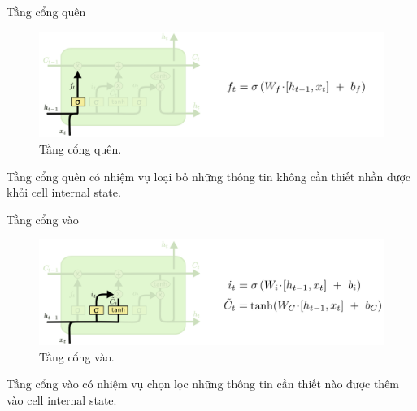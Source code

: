 \documentclass[notheorems,hyperref={bookmarks=true}]{beamer}
\theoremstyle{plain}
\numberwithin{equation}{section}
\begin{document}
\begin{footnotesize}
\begin{frame}{Tầng cổng quên}
\begin{figure}[H]
\centering
	\includegraphics[width=\linewidth]{figures/LSTM3-focus-f.png}
	\caption{Tầng cổng quên.}
\end{figure}
\par Tầng cổng quên có nhiệm vụ loại bỏ những thông tin không cần thiết nhần được khỏi cell internal state.
\end{frame}

\begin{frame}{Tầng cổng vào}
\begin{figure}[H]
\centering
	\includegraphics[width=\linewidth]{figures/LSTM3-focus-i.png}
	\caption{Tầng cổng vào.}
\end{figure}

\par Tầng cổng vào có nhiệm vụ chọn lọc những thông tin cần thiết nào được thêm vào cell internal state. 
\end{frame}


\end{footnotesize}
\end{document}
